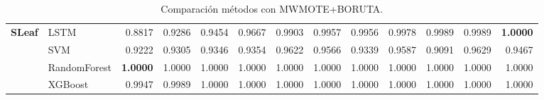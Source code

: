 \begin{table}[h]
\begin{adjustbox}{max width=15cm}
\begin{tabular}{|c|l|r|r|r|r|r|r|r|r|r|r|r|}
				\hline
				\textbf{SLeaf} & LSTM &  0.8817 &  0.9286 &  0.9454 &  0.9667 &  0.9903 &  0.9957 &  0.9956 &  0.9978 &  0.9989 &  0.9989 &  \textbf{1.0000} \\
				& SVM &  0.9222 &  0.9305 &  0.9346 &  0.9354 &  0.9622 &  0.9566 &  0.9339 &  0.9587 &  0.9091 &  0.9629 &  0.9467 \\
				& RandomForest &  \textbf{1.0000} &  1.0000 &  1.0000 &  1.0000 &  1.0000 &  1.0000 &  1.0000 &  1.0000 &  1.0000 &  1.0000 &  1.0000 \\
				& XGBoost &  0.9947 &  0.9989 &  1.0000 &  1.0000 &  1.0000 &  1.0000 &  1.0000 &  1.0000 &  1.0000 &  1.0000 &  1.0000 \\
				\hline
\end{tabular}
\end{adjustbox}
\caption{Comparación métodos con MWMOTE+BORUTA.}
\label{tab:all_comp_mwmote_boruta}
\end{table}

